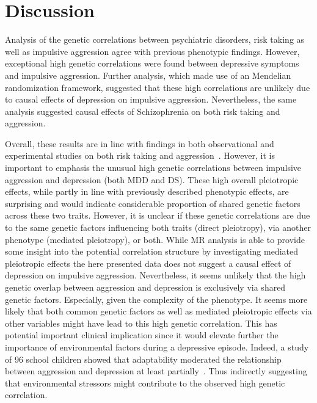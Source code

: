 \section{Discussion}
\label{sec:discussion}

Analysis of the genetic correlations between psychiatric disorders, risk taking as well as impulsive aggression agree with previous phenotypic findings.
However, exceptional high genetic correlations were found between depressive symptoms and impulsive aggression.
Further analysis, which made use of an Mendelian randomization framework, suggested that these high correlations are unlikely due to causal effects of depression on impulsive aggression.
Nevertheless, the same analysis suggested causal effects of Schizophrenia on both risk taking and aggression. 

Overall, these results are in line with findings in both observational and experimental studies on both risk taking and aggression~\cite{Ballester2012,Ouzir2013,Hoptman2015,Sher2005,Roland2002,Taft2009, Dutton2013}.
However, it is important to emphasis the unusual high genetic correlations between impulsive aggression and depression (both MDD and DS).  
These high overall pleiotropic effects, while partly in line with previously described phenotypic effects, are surprising and would indicate considerable proportion of shared genetic factors across these two traits.
However, it is unclear if these genetic correlations are due to the same genetic factors influencing both traits (direct pleiotropy), via another phenotype (mediated pleiotropy), or both.
While MR analysis is able to provide some insight into the potential correlation structure by investigating mediated pleiotropic effects the here presented data does not suggest a causal effect of depression on impulsive aggression.
Nevertheless, it seems unlikely that the high genetic overlap between aggression and depression is exclusively via shared genetic factors.
Especially, given the complexity of the phenotype.
It seems more likely that both common genetic factors as well as mediated pleiotropic effects via other variables might have lead to this high genetic correlation.
This has potential important clinical implication since it would elevate further the importance of environmental factors during a depressive episode.
Indeed, a study of 96 school children showed that adaptability moderated the relationship between aggression and depression at least partially~\cite{Lee2015a}.  
Thus indirectly suggesting that environmental stressors might contribute to the observed high genetic correlation. 

